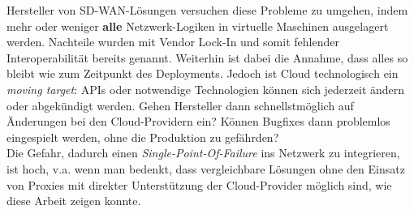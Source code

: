 Hersteller von \gls{SD-WAN}-Lösungen versuchen diese Probleme zu umgehen, indem mehr oder weniger \textbf{alle} Netzwerk-Logiken in virtuelle Maschinen ausgelagert werden. Nachteile wurden mit Vendor Lock-In und somit fehlender Interoperabilität bereits genannt. Weiterhin ist dabei die Annahme, dass alles so bleibt wie zum Zeitpunkt des \gls{Deployment}s. Jedoch ist Cloud technologisch ein \textit{moving target}: APIs oder notwendige Technologien können sich jederzeit ändern oder abgekündigt werden\cite{Yegge2020}. Gehen Hersteller dann schnellstmöglich auf Änderungen bei den Cloud-Providern ein? Können Bugfixes dann problemlos eingespielt werden, ohne die Produktion zu gefährden?\\ 
Die Gefahr, dadurch einen \textit{Single-Point-Of-Failure} ins Netzwerk zu integrieren, ist hoch, v.a. wenn man bedenkt, dass vergleichbare Lösungen ohne den Einsatz von \glqq Proxies\grqq{} mit direkter Unterstützung der Cloud-Provider möglich sind, wie diese Arbeit zeigen konnte.

